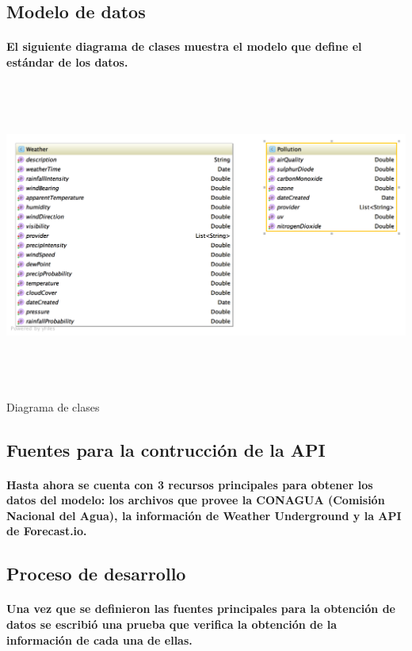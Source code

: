   \newpage   
  \subsection{Modelo de datos} 
  \paragraph{El siguiente diagrama de clases muestra el modelo que define el estándar de los datos.}
    \begin{center}
      \includegraphics[width=14cm,height=10cm]{./images/SmartOwl_ClassDiagram}
      \caption{Diagrama de clases}
    \end{center}

  \newpage
  \subsection{Fuentes para la contrucción de la API}
    \paragraph{Hasta ahora se cuenta con 3 recursos principales para obtener los datos del modelo: los archivos que provee la CONAGUA (Comisión Nacional del Agua), la información de Weather Underground y la API de Forecast.io.}
     
  \subsection{Proceso de desarrollo} 
    \paragraph{Una vez que se definieron las fuentes principales para la obtención de datos se escribió una prueba que verifica la obtención de la información de cada una de ellas.} 
